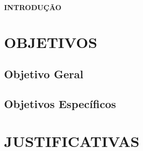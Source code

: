 \vspace{1.2em}
\textbf{\large INTRODUÇÃO}
\vspace{2.9em}
\thispagestyle{empty}



\chapter{OBJETIVOS}


\section{Objetivo Geral}


\section{Objetivos Específicos}

\chapter{JUSTIFICATIVAS}

